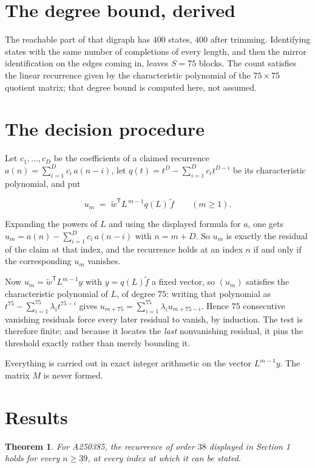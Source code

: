 \documentclass[11pt]{article}
\newtheorem{theorem}{Theorem}
\theoremstyle{definition}
\begin{document}
\section{The degree bound, derived}

The reachable part of that digraph has $400$ states, $400$ after trimming. Identifying states with the same number of completions of every length, and then the mirror identification on the edges coming in, leaves $S = 75$ blocks. The count satisfies the linear recurrence given by the characteristic polynomial of the $75\times75$ quotient matrix; that degree bound is computed here, not assumed.

\section{The decision procedure}

Let $c_1,\dots,c_D$ be the coefficients of a claimed recurrence $a(n) = \sum_{i=1}^{D} c_i\,a(n-i)$, let $q(t) = t^{D} - \sum_{i=1}^{D} c_i t^{D-i}$ be its characteristic polynomial, and put

\[u_m \;=\; \tilde w^{\mathsf T} L^{\,m-1} q(L)\,\tilde f \qquad (m \ge 1).\]

Expanding the powers of $L$ and using the displayed formula for $a$, one gets $u_m = a(n) - \sum_{i=1}^{D} c_i\,a(n-i)$ with $n = m + D$. So $u_m$ is exactly the residual of the claim at that index, and the recurrence holds at an index $n$ if and only if the corresponding $u_m$ vanishes.

Now $u_m = \tilde w^{\mathsf T} L^{m-1} y$ with $y = q(L)\tilde f$ a fixed vector, so $(u_m)$ satisfies the characteristic polynomial of $L$, of degree $75$: writing that polynomial as $t^{75} - \sum_{i=1}^{75} \lambda_i t^{75-i}$ gives $u_{m+75} = \sum_{i=1}^{75} \lambda_i u_{m+75-i}$. Hence $75$ consecutive vanishing residuals force every later residual to vanish, by induction. The test is therefore finite; and because it locates the {\itshape last} nonvanishing residual, it pins the threshold exactly rather than merely bounding it.

Everything is carried out in exact integer arithmetic on the vector $L^{m-1}y$. The matrix $M$ is never formed.

\section{Results}

\begin{theorem} For A250385, the recurrence of order $38$ displayed in Section 1 holds for every $n \ge 39$, at every index at which it can be stated.\end{theorem}
\end{document}
